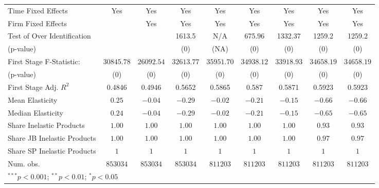 \begin{table}
\begin{center}
\begin{tabular}{l c c c c c c c c}
Time Fixed Effects           & Yes           & Yes           & Yes           & Yes           & Yes           & Yes           & Yes           & Yes           \\
Firm Fixed Effects           &               & Yes           & Yes           & Yes           & Yes           & Yes           & Yes           & Yes           \\
Test of Over Identification  &               &               & 1613.5        & N/A           & 675.96        & 1332.37       & 1259.2        & 1259.2        \\
(p-value)                    &               &               & (0)           & (NA)          & (0)           & (0)           & (0)           & (0)           \\
First Stage F-Statistic:     & $30845.78$    & $26092.54$    & $32613.77$    & $35951.70$    & $34938.12$    & $33918.93$    & $34658.19$    & $34658.19$    \\
(p-value)                    & (0)           & (0)           & (0)           & (0)           & (0)           & (0)           & (0)           & (0)           \\
First Stage Adj. $R^2$       & 0.4846        & 0.4946        & 0.5652        & 0.5865        & 0.587         & 0.5871        & 0.5923        & 0.5923        \\
Mean Elasticity              & $0.25$        & $-0.04$       & $-0.29$       & $-0.02$       & $-0.21$       & $-0.15$       & $-0.66$       & $-0.66$       \\
Median Elasticity            & $0.24$        & $-0.04$       & $-0.29$       & $-0.02$       & $-0.21$       & $-0.15$       & $-0.65$       & $-0.65$       \\
Share Inelastic Products     & $1.00$        & $1.00$        & $1.00$        & $1.00$        & $1.00$        & $1.00$        & $0.93$        & $0.93$        \\
Share JB Inelastic Products  & $1.00$        & $1.00$        & $1.00$        & $1.00$        & $1.00$        & $1.00$        & $0.97$        & $0.97$        \\
Share SP Inelastic Products  & $1$           & $1$           & $1$           & $1$           & $1$           & $1$           & $1$           & $1$           \\
Num. obs.                    & $853034$      & $853034$      & $853034$      & $811203$      & $811203$      & $811203$      & $811203$      & $811203$      \\
\bottomrule
\multicolumn{9}{l}{\scriptsize{$^{***}p<0.001$; $^{**}p<0.01$; $^{*}p<0.05$}}
\end{tabular}
\label{table:coefficients}
\end{center}
\end{table}
